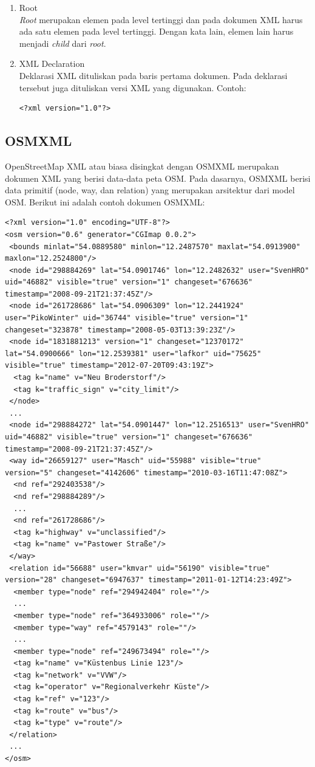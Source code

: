 \begin{enumerate}
\item Root \\
\textit{Root} merupakan elemen pada level tertinggi dan pada dokumen XML harus
ada satu elemen pada level tertinggi. Dengan kata lain, elemen lain harus menjadi
\textit{child} dari \textit{root}.

\item XML Declaration \\
Deklarasi XML dituliskan pada baris pertama dokumen. Pada deklarasi tersebut
juga dituliskan versi XML yang digunakan. Contoh:
\begin{verbatim}
<?xml version="1.0"?>
\end{verbatim}
\end{enumerate}

\subsection{OSMXML}
OpenStreetMap XML atau biasa disingkat dengan OSMXML merupakan dokumen XML yang
berisi data-data peta OSM. Pada dasarnya, OSMXML berisi data primitif
(node, way, dan relation) yang merupakan arsitektur dari model OSM. Berikut
ini adalah contoh dokumen OSMXML:
\begin{lstlisting}
<?xml version="1.0" encoding="UTF-8"?>
<osm version="0.6" generator="CGImap 0.0.2">
 <bounds minlat="54.0889580" minlon="12.2487570" maxlat="54.0913900" maxlon="12.2524800"/>
 <node id="298884269" lat="54.0901746" lon="12.2482632" user="SvenHRO" uid="46882" visible="true" version="1" changeset="676636" timestamp="2008-09-21T21:37:45Z"/>
 <node id="261728686" lat="54.0906309" lon="12.2441924" user="PikoWinter" uid="36744" visible="true" version="1" changeset="323878" timestamp="2008-05-03T13:39:23Z"/>
 <node id="1831881213" version="1" changeset="12370172" lat="54.0900666" lon="12.2539381" user="lafkor" uid="75625" visible="true" timestamp="2012-07-20T09:43:19Z">
  <tag k="name" v="Neu Broderstorf"/>
  <tag k="traffic_sign" v="city_limit"/>
 </node>
 ...
 <node id="298884272" lat="54.0901447" lon="12.2516513" user="SvenHRO" uid="46882" visible="true" version="1" changeset="676636" timestamp="2008-09-21T21:37:45Z"/>
 <way id="26659127" user="Masch" uid="55988" visible="true" version="5" changeset="4142606" timestamp="2010-03-16T11:47:08Z">
  <nd ref="292403538"/>
  <nd ref="298884289"/>
  ...
  <nd ref="261728686"/>
  <tag k="highway" v="unclassified"/>
  <tag k="name" v="Pastower Straße"/>
 </way>
 <relation id="56688" user="kmvar" uid="56190" visible="true" version="28" changeset="6947637" timestamp="2011-01-12T14:23:49Z">
  <member type="node" ref="294942404" role=""/>
  ...
  <member type="node" ref="364933006" role=""/>
  <member type="way" ref="4579143" role=""/>
  ...
  <member type="node" ref="249673494" role=""/>
  <tag k="name" v="Küstenbus Linie 123"/>
  <tag k="network" v="VVW"/>
  <tag k="operator" v="Regionalverkehr Küste"/>
  <tag k="ref" v="123"/>
  <tag k="route" v="bus"/>
  <tag k="type" v="route"/>
 </relation>
 ...
</osm>
\end{lstlisting}
